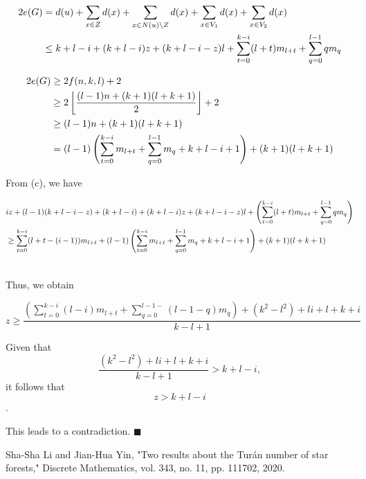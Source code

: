\documentclass[12pt]{elsarticle}
\begin{document}

\begin{small}
    \begin{align}
    2e(G) &= d(u) + \sum_{x \in Z} d(x) + \sum_{x \in N(u) \setminus Z} d(x) + \sum_{x \in V_1} d(x) + \sum_{x \in V_2} d(x) \notag \\
    &\le k + l - i + (k + l - i)z + (k + l - i - z)l + \sum_{t=0}^{k-i}(l + t)m_{l+t} + \sum_{q=0}^{l-1}qm_{q} \notag
    \end{align}
    \end{small}
    
    
    \begin{small}
\begin{align}
2e(G) &\ge 2f(n, k, l) + 2 \notag \\
&\ge 2 \left\lfloor \frac{(l-1)n + (k+1)(l+k+1)}{2} \right\rfloor+2 \notag \\
&\ge (l-1)n + (k+1)(l+k+1) \notag \\
&= (l-1)\left(\sum_{t=0}^{k-i} m_{l+t} + \sum_{q=0}^{l-1} m_{q} + k + l - i + 1\right) + (k+1)(l+k+1) \notag
\end{align}
\end{small}

From (c), we have
\begin{footnotesize}
    \begin{align}
    & iz + (l-1)(k + l - i - z) + (k + l - i) + (k + l - i)z + (k + l - i - z)l + \left(\sum_{t=0}^{k-i}(l + t)m_{l+t} + \sum_{q=0}^{l-1}qm_{q}\right) \notag \\
    & \ge \sum_{t=0}^{k-i} (l + t - (i - 1))m_{l+t} +(l-1)\left(\sum_{t=0}^{k-i} m_{l+t} + \sum_{q=0}^{l-1} m_{q} + k + l - i + 1\right) + (k+1)(l+k+1) \notag
    \end{align}
    \end{footnotesize} \\
    

Thus, we obtain

$$
z \ge \frac{\left(\sum_{t=0}^{k-i} (l - i)m_{l+t} + \sum_{q=0}^{l-1-}(l-1-q) m_{q}\right) + (k^2-l^2)+li+l+k+i}{k-l+1} 
$$

Given that $$\frac{(k^2-l^2)+li+l+k+i}{k-l+1} > k+l-i,$$ it follows that $$z > k + l - i$$.



This leads to a contradiction. $\blacksquare$



\begin{thebibliography}{00}
    Sha-Sha Li and Jian-Hua Yin, "Two results about the Turán number of star forests," Discrete Mathematics, vol. 343, no. 11, pp. 111702, 2020.
    

\end{thebibliography}
\end{document}
